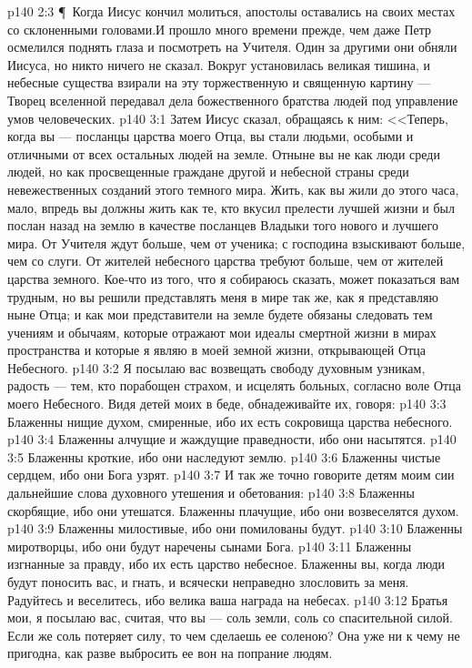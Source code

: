 \vs p140 2:3 \P\ Когда Иисус кончил молиться, апостолы оставались на своих местах со склоненными головами.И прошло много времени прежде, чем даже Петр осмелился поднять глаза и посмотреть на Учителя. Один за другими они обняли Иисуса, но никто ничего не сказал. Вокруг установилась великая тишина, и небесные существа взирали на эту торжественную и священную картину --- Творец вселенной передавал дела божественного братства людей под управление умов человеческих.
\vs p140 3:1 Затем Иисус сказал, обращаясь к ним: <<Теперь, когда вы --- посланцы царства моего Отца, вы стали людьми, особыми и отличными от всех остальных людей на земле. Отныне вы не как люди среди людей, но как просвещенные граждане другой и небесной страны среди невежественных созданий этого темного мира. Жить, как вы жили до этого часа, мало, впредь вы должны жить как те, кто вкусил прелести лучшей жизни и был послан назад на землю в качестве посланцев Владыки того нового и лучшего мира. От Учителя ждут больше, чем от ученика; с господина взыскивают больше, чем со слуги. От жителей небесного царства требуют больше, чем от жителей царства земного. Кое\hyp{}что из того, что я собираюсь сказать, может показаться вам трудным, но вы решили представлять меня в мире так же, как я представляю ныне Отца; и как мои представители на земле будете обязаны следовать тем учениям и обычаям, которые отражают мои идеалы смертной жизни в мирах пространства и которые я являю в моей земной жизни, открывающей Отца Небесного.
\vs p140 3:2 Я посылаю вас возвещать свободу духовным узникам, радость --- тем, кто порабощен страхом, и исцелять больных, согласно воле Отца моего Небесного. Видя детей моих в беде, обнадеживайте их, говоря:
\vs p140 3:3 Блаженны нищие духом, смиренные, ибо их есть сокровища царства небесного.
\vs p140 3:4 Блаженны алчущие и жаждущие праведности, ибо они насытятся.
\vs p140 3:5 Блаженны кроткие, ибо они наследуют землю.
\vs p140 3:6 Блаженны чистые сердцем, ибо они Бога узрят.
\vs p140 3:7 И так же точно говорите детям моим сии дальнейшие слова духовного утешения и обетования:
\vs p140 3:8 Блаженны скорбящие, ибо они утешатся. Блаженны плачущие, ибо они возвеселятся духом.
\vs p140 3:9 Блаженны милостивые, ибо они помилованы будут.
\vs p140 3:10 Блаженны миротворцы, ибо они будут наречены сынами Бога.
\vs p140 3:11 Блаженны изгнанные за правду, ибо их есть царство небесное. Блаженны вы, когда люди будут поносить вас, и гнать, и всячески неправедно злословить за меня. Радуйтесь и веселитесь, ибо велика ваша награда на небесах.
\vs p140 3:12 Братья мои, я посылаю вас, считая, что вы --- соль земли, соль со спасительной силой. Если же соль потеряет силу, то чем сделаешь ее соленою? Она уже ни к чему не пригодна, как разве выбросить ее вон на попрание людям.
